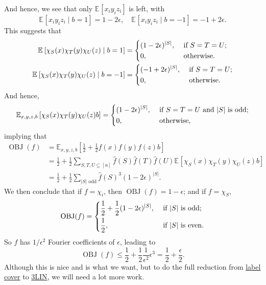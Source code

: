 And hence, we see that only \(\mathbb{E}_{}\left[x_i y_i z_i \right] \) is left, with
\[
	\mathbb{E}_{}\left[x_i y_i z_i \mid b= 1 \right] = 1 - 2\epsilon,
	\quad \mathbb{E}_{}\left[x_i y_i z_i \mid b= -1 \right] = -1 + 2\epsilon.
\]
This suggests that
\[
	\begin{split}
		\mathbb{E}_{}\left[\chi _S(x) \chi _T(y) \chi _U(z) \mid b=1 \right] &= \begin{dcases}
			(1-2\epsilon )^{\vert S \vert }, & \text{ if } S=T=U ;  \\
			0,                               & \text{ otherwise}  .
		\end{dcases}\\
		\mathbb{E}_{}\left[\chi _S(x) \chi _T(y) \chi _U(z) \mid b=-1 \right] &= \begin{dcases}
			(-1+2\epsilon )^{\vert S \vert }, & \text{ if } S=T=U ;  \\
			0,                                & \text{ otherwise}  .
		\end{dcases}
	\end{split}
\]
And hence,
\[
	\mathbb{E}_{x, y, z, b}\left[\chi _S(x) \chi _T(y) \chi _U(z) b \right] = \begin{dcases}
		(1 - 2\epsilon )^{\vert S \vert }, & \text{ if } S=T=U \text{ and \(\vert S \vert \) is odd}; \\
		0,                                 & \text{ otherwise} ,
	\end{dcases}
\]
implying that
\[
	\begin{split}
		\mathop{\mathrm{OBJ}}(f)
		&= \mathbb{E}_{x, y, z, b}\left[\frac{1}{2} + \frac{1}{2} f(x) f(y) f(z) b \right] \\
		&= \frac{1}{2} + \frac{1}{2} \sum_{S, T, U \subseteq [n]} \hat{f} (S) \hat{f} (T) \hat{f} (U) \mathbb{E}_{}\left[\chi _S(x) \chi _T(y) \chi _U(z) b \right] \\
		&= \frac{1}{2} + \frac{1}{2} \sum_{\vert S \vert \text{ odd}} \hat{f} (S)^3 (1 - 2\epsilon )^{\vert S \vert }.
	\end{split}
\]
We then conclude that if \(f = \chi _i\), then \(\mathop{\mathrm{OBJ}}(f) = 1 - \epsilon \); and if \(f = \chi _S\),
\[
	\mathop{\mathrm{OBJ}}(f) = \begin{dcases}
		\frac{1}{2} + \frac{1}{2} (1-2\epsilon )^{\vert S \vert }, & \text{ if \(\vert S \vert \) is odd};  \\
		\frac{1}{2},                                               & \text{ if \(\vert S \vert \) is even}.
	\end{dcases}
\]
So \(f\) has \(1 / \epsilon ^2\) Fourier coefficients of \(\epsilon \), leading to
\[
	\mathop{\mathrm{OBJ}}(f) \leq \frac{1}{2} + \frac{1}{2}\frac{1}{\epsilon ^2} \epsilon ^3 = \frac{1}{2} + \frac{\epsilon}{2}.
\]
Although this is nice and is what we want, but to do the full reduction from \hyperref[prb:label-cover]{label cover} to \hyperref[prb:max-3LIN]{3LIN}, we will need a lot more work.


